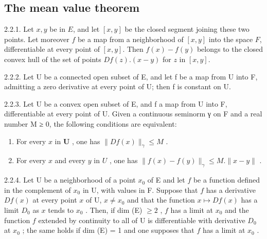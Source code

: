 \subsection{The mean value theorem}

2.2.1. Let \(x,y\) be in \(E\), and let \([x,y]\) be the closed segment joining these two points. Let moreover \(f\) be a map from a neighborhood of \([x,y]\) into the space \(F\), differentiable at every point of \([x,y]\). Then \(f(x)-f(y)\) belongs to the closed convex hull of the set of points \(Df(z).(x-y)\) for \(z\) in \([x,y]\).

2.2.2. Let U be a connected open subset of E, and let f be a map from U into
F, admitting a zero derivative at every point of U; then f is constant on U.

2.2.3. Let U be a convex open subset of E, and f a map from U into F, differentiable at every point of U. Given a continuous seminorm γ on F and a real number M ≥ 0, the following conditions are equivalent:

\begin{enumerate}
\def\labelenumi{(\roman{enumi})}
\item
  For every \(x\) in \(\mathbf{U}\) , one has \(\| Df(x)\|_{\gamma}\leqslant M\) .
\item
  For every \(x\) and every \(y\) in \(U\) , one has \(\| f(x) - f(y)\|_{\gamma} \leqslant M . \| x - y\| \) .
\end{enumerate}

2.2.4. Let U be a neighborhood of a point \(x_0\) of E and let \(f\) be a function defined in the complement of \(x_0\) in U, with values in F. Suppose that \(f\) has a derivative \(Df(x)\) at every point \(x\) of U, \(x \neq x_0\) and that the function \(x \mapsto Df(x)\) has a limit \(D_0\) as \(x\) tends to \(x_0\) . Then, if dim (E) \(\geqslant 2\) , \(f\) has a limit at \(x_0\) and the function \(f\) extended by continuity to all of U is differentiable with derivative \(D_0\) at \(x_0\) ; the same holds if dim (E) = 1 and one supposes that \(f\) has a limit at \(x_0\) .


